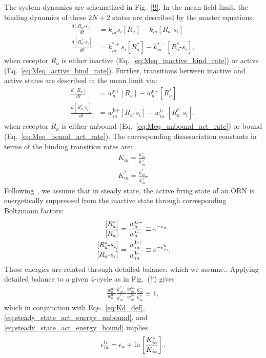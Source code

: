 The system dynamics are schematized in Fig.~\ref{!!}. In the mean-field limit, the binding dynamics of these $2N + 2$ states are described by the master equations:
\begin{align}
\frac{d[R_a\text{-}s_i]}{dt} &= k^+_{ia}s_i[R_a] - k^-_{ia}[R_a\text{-}s_i] \label{eq:Meq_inactive_bind_rate}\\
\frac{d[R^*_a\text{-}s_i]}{dt} &= k^{*+}_{ia}s_i[R^*_a] - k^{*-}_{ia}[R^*_a\text{-}s_i],\label{eq:Meq_active_bind_rate}
\end{align}
when receptor $R_a$ is either inactive (Eq.~\ref{eq:Meq_inactive_bind_rate}) or active (Eq.~\ref{eq:Meq_active_bind_rate}). Further, transitions between inactive and active states are described in the mean limit via:
\begin{align}
\frac{d[R_a]}{dt} &= w^{\text{u}+}_a [R_a] - w^{\text{u}-}_a [R^*_a] \label{eq:Meq_unbound_act_rate}\\
\frac{d[R^*_a\text{-}s_i]}{dt} &=  w^{\text{b}+}_{ia} [R_a\text{-}s_i] - w^{\text{b}-}_{ia}  [R^*_a\text{-}s_i],
\label{eq:Meq_bound_act_rate}
\end{align}
when receptor $R_a$ is either unbound (Eq.~\ref{eq:Meq_unbound_act_rate}) or bound (Eq.~\ref{eq:Meq_bound_act_rate}). The corresponding disassociation constants in terms of the binding transition rates are:
\begin{align}
K_{ia} = \frac{k^-_{ia}}{k^+_{ia}} \nonumber \\
K^*_{ia} = \frac{k^{*-}_{ia}}{k^{+*}_{ia}} \label{eq:Kd_def}
\end{align}
Following~\cite{srinivas_elife}, we assume that in steady state, the active firing state of an ORN is energetically suppressed from the inactive state through corresponding Boltzmann factors:
\begin{align}
\frac{[R^*_a]}{[R_a]} &= \frac{w^{\text{u}+}_a}{w^{\text{u}-}_a} \equiv e^{-\epsilon_a} \label{eq:steady_state_act_energy_unbound} \\
\frac{[R^*_a\text{-}s_i]}{[R_a\text{-}s_i]} &= \frac{w^{\text{b}+}_{ia}}{w^{\text{b}-}_{ia}} \equiv e^{-\epsilon^{\text b}_{ia}}\label{eq:steady_state_act_energy_bound}.
\end{align}
These energies are related through detailed balance, which we assume.. Applying detailed balance to a given 4-cycle as in Fig.~(!!) gives
\begin{align}
\frac{w^{\text{u}+}_a}{w^{\text{u}-}_a}\frac{k^{*+}_{ia}}{k^{*-}_{ia}}\frac{w^{\text{b}-}_{ia}}{w^{\text{b}+}_{ia}}\frac{k^{-}_{ia}}{k^{+}_{ia}} \equiv 1,
\end{align}
which in conjunction with Eqs.~\ref{eq:Kd_def}, \ref{eq:steady_state_act_energy_unbound}, and \ref{eq:steady_state_act_energy_bound} implies
\begin{align}
\epsilon_{ia}^{\text b} = \epsilon_a + \ln\left[\frac{K^*_{ia}}{K_{ia}}\right].
\end{align}

